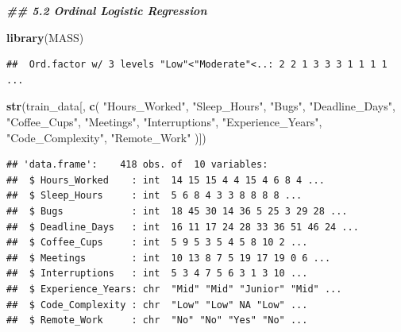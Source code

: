 \documentclass[
]{article}
\newenvironment{Shaded}{\begin{snugshade}}{\end{snugshade}}
\newcommand{\DocumentationTok}[1]{\textcolor[rgb]{0.56,0.35,0.01}{\textbf{\textit{#1}}}}
\newcommand{\FunctionTok}[1]{\textcolor[rgb]{0.13,0.29,0.53}{\textbf{#1}}}
\newcommand{\NormalTok}[1]{#1}
\newcommand{\SpecialCharTok}[1]{\textcolor[rgb]{0.81,0.36,0.00}{\textbf{#1}}}
\newcommand{\StringTok}[1]{\textcolor[rgb]{0.31,0.60,0.02}{#1}}
\begin{document}
\begin{Shaded}
\begin{Highlighting}[]
\DocumentationTok{\#\# 5.2 Ordinal Logistic Regression}

\FunctionTok{library}\NormalTok{(MASS)}
\end{Highlighting}
\end{Shaded}

\begin{Shaded}
\end{Shaded}

\begin{verbatim}
##  Ord.factor w/ 3 levels "Low"<"Moderate"<..: 2 2 1 3 3 3 1 1 1 1 ...
\end{verbatim}

\begin{Shaded}
\begin{Highlighting}[]
\FunctionTok{str}\NormalTok{(train\_data[, }\FunctionTok{c}\NormalTok{(}
  \StringTok{"Hours\_Worked"}\NormalTok{,}
  \StringTok{"Sleep\_Hours"}\NormalTok{,}
  \StringTok{"Bugs"}\NormalTok{,}
  \StringTok{"Deadline\_Days"}\NormalTok{,}
  \StringTok{"Coffee\_Cups"}\NormalTok{,}
  \StringTok{"Meetings"}\NormalTok{,}
  \StringTok{"Interruptions"}\NormalTok{,}
  \StringTok{"Experience\_Years"}\NormalTok{,}
  \StringTok{"Code\_Complexity"}\NormalTok{,}
  \StringTok{"Remote\_Work"}
\NormalTok{)])}
\end{Highlighting}
\end{Shaded}

\begin{verbatim}
## 'data.frame':    418 obs. of  10 variables:
##  $ Hours_Worked    : int  14 15 15 4 4 15 4 6 8 4 ...
##  $ Sleep_Hours     : int  5 6 8 4 3 3 8 8 8 8 ...
##  $ Bugs            : int  18 45 30 14 36 5 25 3 29 28 ...
##  $ Deadline_Days   : int  16 11 17 24 28 33 36 51 46 24 ...
##  $ Coffee_Cups     : int  5 9 5 3 5 4 5 8 10 2 ...
##  $ Meetings        : int  10 13 8 7 5 19 17 19 0 6 ...
##  $ Interruptions   : int  5 3 4 7 5 6 3 1 3 10 ...
##  $ Experience_Years: chr  "Mid" "Mid" "Junior" "Mid" ...
##  $ Code_Complexity : chr  "Low" "Low" NA "Low" ...
##  $ Remote_Work     : chr  "No" "No" "Yes" "No" ...
\end{verbatim}
\end{document}
